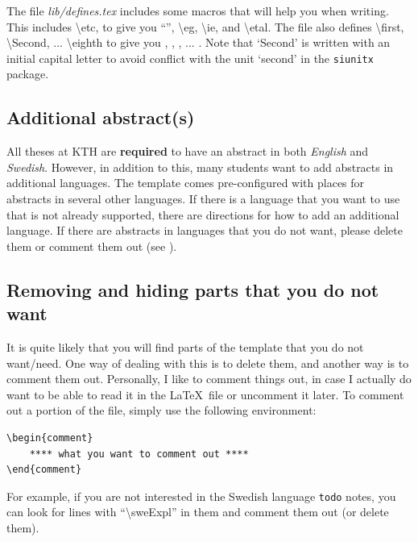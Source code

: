 \documentclass[examplethesis.tex]{subfiles}
\begin{document}
The file \textit{lib/defines.tex} includes some macros that will help you when writing. This includes \textbackslash etc, to give you ``\etc'', \textbackslash eg, \textbackslash ie, and \textbackslash etal.
The file also defines \textbackslash first, \textbackslash Second, ... \textbackslash eighth to give you \first, \Second, \third, ... \eighth. Note that `Second' is written with an initial capital letter to avoid conflict with the unit `second' in the \texttt{siunitx} package.

\subsection{Additional abstract(s)}
\label{sec:additionalAbstracts}

All theses at KTH are \textbf{required} to have an abstract in both \textit{English} and \textit{Swedish}. However, in addition to this, many students want to add abstracts in additional languages. The template comes pre-configured with places for abstracts in several other languages. If there is a language that you want to use that is not already supported, there are directions for how to add an additional language. If there are abstracts in languages that you do not want, please delete them or comment them out (see ).

\subsection{Removing and hiding parts that you do not want}
\label{sec:hideComment}

It is quite likely that you will find parts of the template that you do not want/need. One way of dealing with this is to delete them, and another way is to comment them out. Personally, I like to comment things out, in case I actually do want to be able to read it in the \LaTeX\  file or uncomment it later. To comment out a portion of the file, simply use the following environment:

\begin{lstlisting}[style=latexExampleForAuthors]
\begin{comment}
    **** what you want to comment out ****
\end{comment}
\end{lstlisting}

For example, if you are not interested in the Swedish language \texttt{todo} notes, you can look for lines with ``\textbackslash sweExpl'' in them and comment them out (or delete them).
\end{document}
